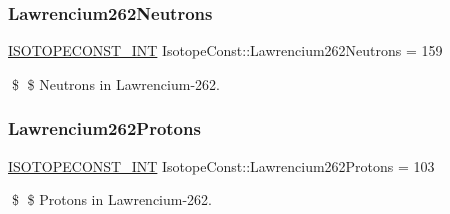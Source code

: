 \subsubsection{\texorpdfstring{Lawrencium262\+Neutrons}{Lawrencium262Neutrons}}
{\footnotesize\ttfamily \mbox{\hyperlink{group___isotope_const-_macros_ga5f18360b3e99483a35c32d789e62621c}{I\+S\+O\+T\+O\+P\+E\+C\+O\+N\+S\+T\+\_\+\+I\+NT}} Isotope\+Const\+::\+Lawrencium262\+Neutrons = 159}

\$ \$ Neutrons in Lawrencium-\/262. \mbox{\label{group___isotope_const-_lawrencium-_lr262_ga8636e93a9275ec2313f1aac2b53e31ce}} 
\subsubsection{\texorpdfstring{Lawrencium262\+Protons}{Lawrencium262Protons}}
{\footnotesize\ttfamily \mbox{\hyperlink{group___isotope_const-_macros_ga5f18360b3e99483a35c32d789e62621c}{I\+S\+O\+T\+O\+P\+E\+C\+O\+N\+S\+T\+\_\+\+I\+NT}} Isotope\+Const\+::\+Lawrencium262\+Protons = 103}

\$ \$ Protons in Lawrencium-\/262. 